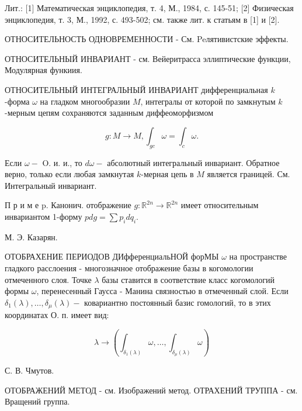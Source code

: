 \documentclass[10pt]{article}
\begin{document}
Лит.: [1] Математическая энциклопедия, т. 4, М., 1984, с. 145-51; [2] Физическая энциклопедия, т. 3, М., 1992, с. 493-502; см. также лит. к статьям в [1] и [2].



ОТНОСИТЕЛЬНОСТЬ ОДНОВРЕМЕННОСТИ - См. Peлятивистские эффекты.



ОТНОСИТЕЛЬНЫЙ ИНВАРИАНТ - см. Вейеритрасса эллиптические функции, Модулярная функиия.



ОТНОСИТЕЛЬНЫЙ ИНТЕГРАЛЬНЫЙ ИНВАРИАНТ дифференциальная $k$-форма $\omega$ на гладком многообразии $M$, интегралы от которой по замкнутым $k$-мерным цепям сохраняются заданным диффеоморфизмом



\[

g: M \rightarrow M, \int_{g c} \omega=\int_{c} \omega .

\]



Если $\omega-$ O. и. и., то $d \omega-$ абсолютный интегральный инвариант. Обратное верно, только если любая замкнутая $k$-мерная цепь в $M$ является границей. См. Интегральный инвариант.



П р и м е p. Канонич. отображение $g: \mathbb{R}^{2 n} \rightarrow \mathbb{R}^{2 n}$ имеет относительным инвариантом 1-форму $p d g=\sum p_{i} d q_{i}$.



М. Э. Казарян.



ОТОБРАХЕНИЕ ПЕРИОДОВ ДИфференциальНОЙ форМЫ $\omega$ на пространстве гладкого расслоения - многозначное отображение базы в когомологии отмеченного слоя. Точке $\lambda$ базы ставится в соответствие класс когомологий формы $\omega$, перенесенный Гаусса - Манина связностью в отмеченный слой. Если $\delta_{1}(\lambda), \ldots, \delta_{\mu}(\lambda)-$ ковариантно постоянный базис гомологий, то в этих координатах О. п. имеет вид:



\[

\lambda \rightarrow\left(\int_{\delta_{1}(\lambda)} \omega, \ldots, \int_{\delta_{\mu}(\lambda)} \omega\right)

\]



С. В. Чмутов.



ОТОБРАЖЕНИЙ МЕТОД - см. Изображений метод. ОТРАХЕНИЙ ТРУППА - см. Вращений группа.
\end{document}
